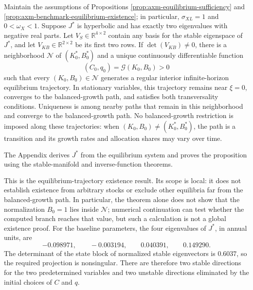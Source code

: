 \Needspace{0.30\textheight}
\begin{proposition}
\label{prop:axm-unit-saddle-path}
Maintain the assumptions of Propositions
\ref{prop:axm-equilibrium-sufficiency} and
\ref{prop:axm-benchmark-equilibrium-existence}; in particular,
\(\sigma_{XL}=1\) and \(0<\omega_X<1\). Suppose \(J^*\) is hyperbolic and has
exactly two eigenvalues with negative real parts. Let
\(V_S\in\mathbb R^{4\times2}\) contain any basis for the stable eigenspace of
\(J^*\), and let \(V_{KB}\in\mathbb R^{2\times2}\) be its first two rows. If
\(\det(V_{KB})\ne0\), there is a neighborhood \(\mathcal N\) of
\((K_0^*,B_0^*)\) and a unique continuously differentiable function
\[
 (C_0,q_0)=\mathcal G(K_0,B_0)>0
\]
such that every \((K_0,B_0)\in\mathcal N\) generates a regular interior
infinite-horizon equilibrium trajectory. In stationary variables, this
trajectory remains near \(\xi=0\), converges to the balanced-growth path, and
satisfies both transversality conditions. Uniqueness is among nearby paths that
remain in this neighborhood and converge to the balanced-growth path. No
balanced-growth restriction is imposed along these trajectories: when
\((K_0,B_0)\ne(K_0^*,B_0^*)\), the path is a transition and its growth rates
and allocation shares may vary over time.
\end{proposition}

The Appendix derives \(J^*\) from the equilibrium system and proves the
proposition using the stable-manifold and inverse-function theorems.

This is the equilibrium-trajectory existence result. Its scope is local: it
does not establish existence from arbitrary stocks or exclude other equilibria
far from the balanced-growth path. In particular, the theorem alone does not
show that the normalization \(B_0=1\) lies inside \(\mathcal N\); numerical
continuation can test whether the computed branch reaches that value, but such
a calculation is not a global existence proof. For the baseline parameters,
the four eigenvalues of \(J^*\), in annual units, are
\begin{equation}
 -0.098971,\qquad -0.003194,\qquad 0.040391,\qquad 0.149290.
 \label{eq:axm-calibrated-jacobian-roots}
\end{equation}
The determinant of the state block of normalized stable eigenvectors is
\(0.6037\), so the required projection is nonsingular. There are therefore two
stable directions for the two predetermined variables and two unstable
directions eliminated by the initial choices of \(C\) and \(q\).

